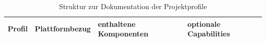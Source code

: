 \begin{table}[H]
  \centering
  \small
  \renewcommand{\arraystretch}{1.2}
  \caption{Struktur zur Dokumentation der Projektprofile}
  \label{tab:profile-matrix}
  \begin{tabularx}{\textwidth}{@{}p{}p{}p{}>{\raggedright\arraybackslash}X@{}}
    \toprule
    \textbf{Profil} & \textbf{Plattformbezug} & \textbf{enthaltene Komponenten} & \textbf{optionale Capabilities} \\
    \midrule
    \bottomrule
  \end{tabularx}
\end{table}
